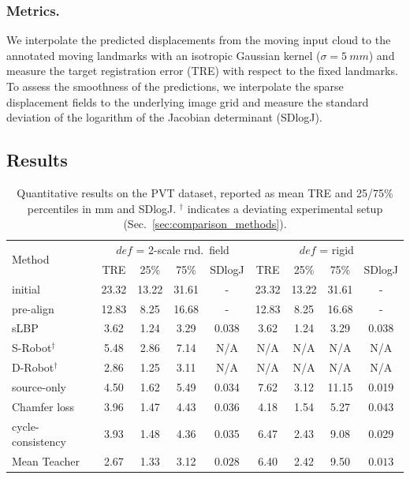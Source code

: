 \documentclass[runningheads]{llncs}
\begin{document}
\subsubsection{Metrics.}
We interpolate the predicted displacements from the moving input cloud to the annotated moving landmarks with an isotropic Gaussian kernel ($\sigma=\SI{5}{mm}$) and measure the target registration error (TRE) with respect to the fixed landmarks.
To assess the smoothness of the predictions, we interpolate the sparse displacement fields to the underlying image grid and measure the standard deviation of the logarithm of the Jacobian determinant (SDlogJ).

\subsection{Results}
\begin{table}[t]
\setlength{\tabcolsep}{4pt}
\caption{Quantitative results on the PVT dataset, reported as mean TRE and 25/75\% percentiles in mm and SDlogJ. $^{\dag}$ indicates a deviating experimental setup (Sec.~\ref{sec:comparison_methods}).}
\label{tab:results}
\centering
\begin{tabular}{lcccccccc}
\toprule
\multirow{2}{*}{Method} & \multicolumn{4}{c}{$def$ = 2-scale rnd.~field} & \multicolumn{4}{c}{$def$ = rigid}\\
    & TRE & 25\% & 75\% & SDlogJ & TRE & 25\% & 75\% & SDlogJ\\
\midrule
initial & 23.32 & 13.22 & 31.61 & - & 23.32 & 13.22 & 31.61 & -\\
pre-align & 12.83 & 8.25 & 16.68 & - & 12.83 & 8.25 & 16.68 & -\\
\midrule
sLBP \cite{hansen2021deep} & 3.62 & 1.24 & 3.29 & 0.038 & 3.62 & 1.24 & 3.29 & 0.038\\
S-Robot$^{\dag}$ \cite{shen2021accurate} & 5.48 & 2.86 & 7.14 & N/A & N/A & N/A & N/A & N/A\\
D-Robot$^{\dag}$ \cite{shen2021accurate} & 2.86 & 1.25 & 3.11 & N/A & N/A & N/A & N/A & N/A\\
\midrule
source-only & 4.50 & 1.62 & 5.49 & 0.034 & 7.62 & 3.12 & 11.15 & 0.019\\
Chamfer loss \cite{wu2020pointpwc} & 3.96 & 1.47 & 4.43 & 0.036 & 4.18 & 1.54 & 5.27 & 0.043\\
cycle-consistency \cite{mittal2020just} & 3.93 & 1.48 & 4.36 & 0.035 & 6.47 & 2.43 & 9.08 & 0.029\\ %
Mean Teacher \cite{bigalke2022adapting} & 2.67 & 1.33 & 3.12 & $\boldsymbol{0.028}$ & 6.40 & 2.42 & 9.50 & $\boldsymbol{0.013}$\\

\end{tabular}
\end{table}
\end{document}
